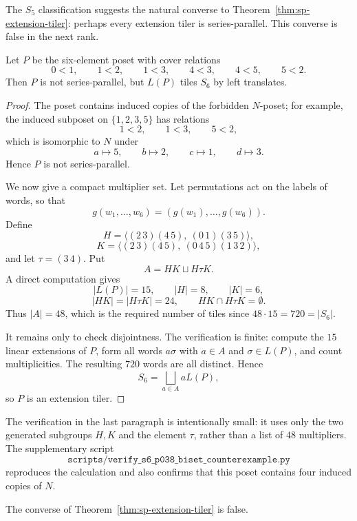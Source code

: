 The $S_5$ classification suggests the natural converse to
Theorem~\ref{thm:sp-extension-tiler}: perhaps every extension tiler is
series-parallel.  This converse is false in the next rank.

\begin{theorem}
\label{thm:s6-counterexample}
Let $P$ be the six-element poset with cover relations
\[
        0<1,\qquad 1<2,\qquad 1<3,\qquad
        4<3,\qquad 4<5,\qquad 5<2 .
\]
Then $P$ is not series-parallel, but $L(P)$ tiles $S_6$ by left
translates.
\end{theorem}

\begin{proof}
The poset contains induced copies of the forbidden $N$-poset; for example,
the induced subposet on $\{1,2,3,5\}$ has relations
\[
        1<2,\qquad 1<3,\qquad 5<2,
\]
which is isomorphic to $N$ under
\[
        a\mapsto 5,\qquad b\mapsto 2,\qquad
        c\mapsto 1,\qquad d\mapsto 3.
\]
Hence $P$ is not series-parallel.

We now give a compact multiplier set.  Let permutations act on the labels
of words, so that
\[
        g(w_1,\ldots,w_6)=(g(w_1),\ldots,g(w_6)).
\]
Define
\[
H=\langle (2\,3)(4\,5),\ (0\,1)(3\,5)\rangle,
\]
\[
K=\langle (2\,3)(4\,5),\ (0\,4\,5)(1\,3\,2)\rangle,
\]
and let $\tau=(3\,4)$.  Put
\[
        A=HK\sqcup H\tau K.
\]
A direct computation gives
\[
        |L(P)|=15,\qquad |H|=8,\qquad |K|=6,
\]
\[
        |HK|=|H\tau K|=24,\qquad HK\cap H\tau K=\emptyset.
\]
Thus $|A|=48$, which is the required number of tiles since
$48\cdot 15=720=|S_6|$.

It remains only to check disjointness.  The verification is finite:
compute the $15$ linear extensions of $P$, form all words $a\sigma$ with
$a\in A$ and $\sigma\in L(P)$, and count multiplicities.  The resulting
$720$ words are all distinct.  Hence
\[
        S_6=\bigsqcup_{a\in A} aL(P),
\]
so $P$ is an extension tiler.
\end{proof}

The verification in the last paragraph is intentionally small: it uses
only the two generated subgroups $H,K$ and the element $\tau$, rather than
a list of $48$ multipliers.  The supplementary script
\[
\texttt{scripts/verify\_s6\_p038\_biset\_counterexample.py}
\]
reproduces the calculation and also confirms that this poset contains
four induced copies of $N$.

\begin{corollary}
\label{cor:extension-tiler-converse-false}
The converse of Theorem~\ref{thm:sp-extension-tiler} is false.
\end{corollary}

